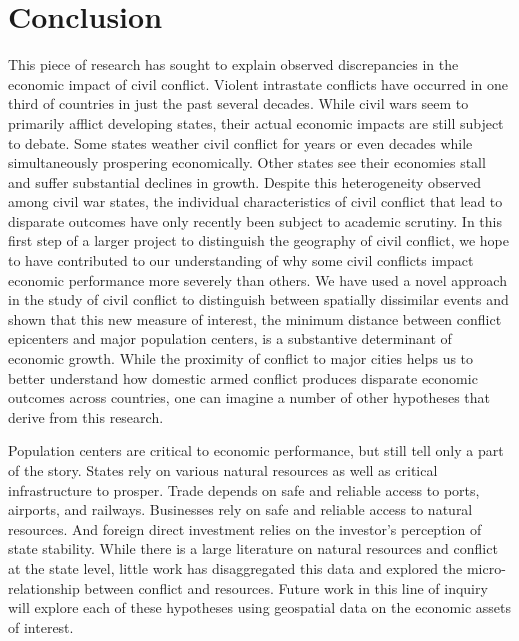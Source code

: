 \section{Conclusion}
\label{conclusion}

This piece of research has sought to explain observed discrepancies in the economic impact of civil conflict. Violent intrastate conflicts have occurred in one third of countries in just the past several decades. While civil wars seem to primarily afflict developing states, their actual economic impacts are still subject to debate. Some states weather civil conflict for years or even decades while simultaneously prospering economically. Other states see their economies stall and suffer substantial declines in growth. Despite this heterogeneity observed among civil war states, the individual characteristics of civil conflict that lead to disparate outcomes have only recently been subject to academic scrutiny. In this first step of a larger project to distinguish the geography of civil conflict, we hope to have contributed to our understanding of why some civil conflicts impact economic performance more severely than others. We have used a novel approach in the study of civil conflict to distinguish between spatially dissimilar events and shown that this new measure of interest, the minimum distance between conflict epicenters and major population centers, is a substantive determinant of economic growth. While the proximity of conflict to major cities helps us to better understand how domestic armed conflict produces disparate economic outcomes across countries, one can imagine a number of other hypotheses that derive from this research.

Population centers are critical to economic performance, but still tell only a part of the story. States rely on various natural resources as well as critical infrastructure to prosper. Trade depends on safe and reliable access to ports, airports, and railways. Businesses rely on safe and reliable access to natural resources. And foreign direct investment relies on the investor's perception of state stability. While there is a large literature on natural resources and conflict at the state level, little work has disaggregated this data and explored the micro-relationship between conflict and resources. Future work in this line of inquiry will explore each of these hypotheses using geospatial data on the economic assets of interest.

